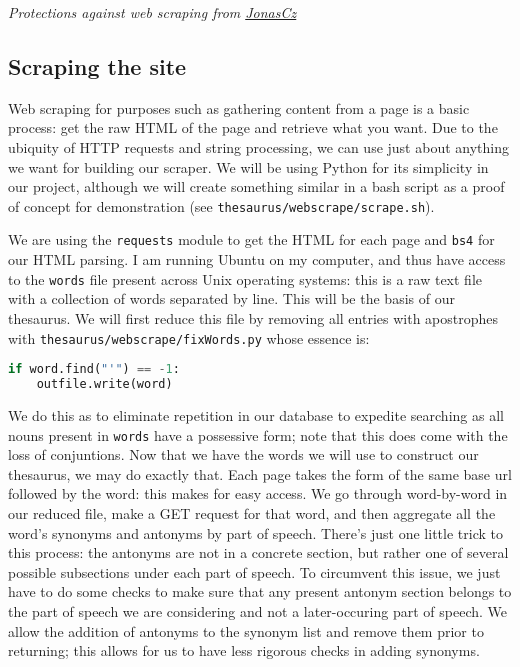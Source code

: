 \documentclass[11pt, twoside, reqno]{book}
\begin{document}
\textit{Protections against web scraping from \href{https://github.com/JonasCz/How-To-Prevent-Scraping/blob/master/README.md}{JonasCz}}

\subsection{Scraping the site}

Web scraping for purposes such as gathering content from a page is a basic process: get the raw HTML of the page and retrieve what you want. Due to the ubiquity of HTTP requests and string processing, we can use just about anything we want for building our scraper. We will be using Python for its simplicity in our project, although we will create something similar in a bash script as a proof of concept for demonstration (see \texttt{thesaurus/webscrape/scrape.sh}).


We are using the \texttt{requests} module to get the HTML for each page and \texttt{bs4} for our HTML parsing. I am running Ubuntu on my computer, and thus have access to the \texttt{words} file present across Unix operating systems: this is a raw text file with a collection of words separated by line. This will be the basis of our thesaurus. We will first reduce this file by removing all entries with apostrophes with \texttt{thesaurus/webscrape/fixWords.py} whose essence is:
\begin{lstlisting}[language=Python]
if word.find("'") == -1:
    outfile.write(word)
\end{lstlisting}

We do this as to eliminate repetition in our database to expedite searching as all nouns present in \texttt{words} have a possessive form; note that this does come with the loss of conjuntions. Now that we have the words we will use to construct our thesaurus, we may do exactly that. Each page takes the form of the same base url followed by the word: this makes for easy access. We go through word-by-word in our reduced file, make a GET request for that word, and then aggregate all the word's synonyms and antonyms by part of speech. There's just one little trick to this process: the antonyms are not in a concrete section, but rather one of several possible subsections under each part of speech. To circumvent this issue, we just have to do some checks to make sure that any present antonym section belongs to the part of speech we are considering and not a later-occuring part of speech. We allow the addition of antonyms to the synonym list and remove them prior to returning; this allows for us to have less rigorous checks in adding synonyms.
\end{document}
